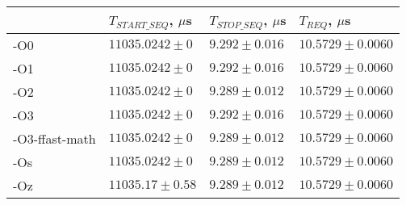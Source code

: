 \begin{tabular}{llll}
\toprule
 & $T_{START\_SEQ}$, $\mu$s & $T_{STOP\_SEQ}$, $\mu$s & $T_{REQ}$, $\mu$s \\
\midrule
-O0 & $11035.0242 \pm 0$ & $9.292 \pm 0.016$ & $10.5729 \pm 0.0060$ \\
-O1 & $11035.0242 \pm 0$ & $9.292 \pm 0.016$ & $10.5729 \pm 0.0060$ \\
-O2 & $11035.0242 \pm 0$ & $9.289 \pm 0.012$ & $10.5729 \pm 0.0060$ \\
-O3 & $11035.0242 \pm 0$ & $9.292 \pm 0.016$ & $10.5729 \pm 0.0060$ \\
-O3-ffast-math & $11035.0242 \pm 0$ & $9.289 \pm 0.012$ & $10.5729 \pm 0.0060$ \\
-Os & $11035.0242 \pm 0$ & $9.289 \pm 0.012$ & $10.5729 \pm 0.0060$ \\
-Oz & $11035.17 \pm 0.58$ & $9.289 \pm 0.012$ & $10.5729 \pm 0.0060$ \\
\bottomrule
\end{tabular}
